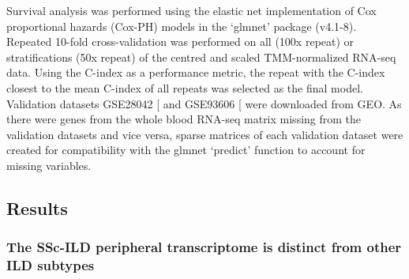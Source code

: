 \documentclass[
]{article}
\begin{document}
Survival analysis was performed using the elastic net implementation of Cox proportional hazards (Cox-PH) models in the `glmnet' package (v4.1-8). Repeated 10-fold cross-validation was performed on all (100x repeat) or stratifications (50x repeat) of the centred and scaled TMM-normalized RNA-seq data. Using the C-index as a performance metric, the repeat with the C-index closest to the mean C-index of all repeats was selected as the final model. Validation datasets GSE28042 {[}\citeproc{ref-herazo-maya_peripheral_2013}{59}{]} and GSE93606 {[}\citeproc{ref-molyneaux_host-microbial_2017}{55}{]} were downloaded from GEO. As there were genes from the whole blood RNA-seq matrix missing from the validation datasets and vice versa, sparse matrices of each validation dataset were created for compatibility with the glmnet `predict' function to account for missing variables.

\subsection{Results}\label{results-2}

\subsubsection{The SSc-ILD peripheral transcriptome is distinct from other ILD subtypes}\label{the-ssc-ild-peripheral-transcriptome-is-distinct-from-other-ild-subtypes}
\end{document}
